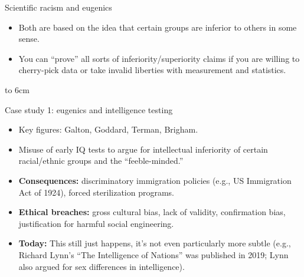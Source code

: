 \documentclass[aspectratio=169]{beamer}
\begin{document}
\begin{frame}{Scientific racism and eugenics}
  \begin{itemize}
    \item Both are based on the idea that certain groups are inferior to others in some sense.
    \item You can ``prove'' all sorts of inferiority/superiority claims if you are willing to cherry-pick data or take invalid liberties with measurement and statistics.
  \end{itemize}
  \vbox to 6cm{
  \vfill
}
\end{frame}

\begin{frame}{Case study 1: eugenics and intelligence testing}
  \begin{itemize}
    \item Key figures: Galton, Goddard, Terman, Brigham.\pause
    \item Misuse of early IQ tests to argue for intellectual inferiority of certain racial/ethnic groups and the ``feeble-minded.''\pause
    \item \textbf{Consequences:} discriminatory immigration policies (e.g., US Immigration Act of 1924), forced sterilization programs.\pause
    \item \textbf{Ethical breaches:} gross cultural bias, lack of validity, confirmation bias, justification for harmful social engineering.\pause
    \item \textbf{Today:} This still just happens, it's not even particularly more subtle (e.g., Richard Lynn's ``The Intelligence of Nations'' was published in 2019; Lynn also argued for sex differences in intelligence).
  \end{itemize}
\end{frame}
\end{document}
